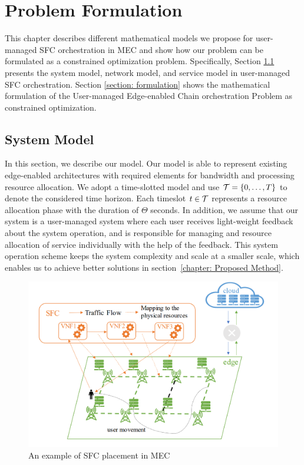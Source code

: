 \chapter{\textbf{Problem Formulation}}
This chapter describes different mathematical models we propose for user-managed SFC orchestration in MEC and show how our problem can be formulated as a constrained optimization problem. Specifically, Section \ref{section: system model} presents the system model, network model, and service model in user-managed SFC orchestration. Section \ref{section: formulation} shows the mathematical formulation of the User-managed Edge-enabled Chain orchestration Problem as constrained optimization.


\section{System Model}
\label{section: system model}
In this section, we describe our model.
Our model is able to represent existing edge-enabled architectures with required elements for bandwidth and processing resource allocation.
We adopt a time-slotted model and use $\mathcal{T}=\{0,\dots,T\}$ to denote the considered time horizon. Each timeslot $t\in\mathcal{T}$ represents a resource allocation phase with the duration of $\Theta$ seconds.   
In addition, we assume that our system is a user-managed system where each user receives light-weight feedback about the system operation, and is responsible for managing and resource allocation of service individually with the help of the feedback.
This system operation scheme keeps the system complexity and scale at a smaller scale, which enables us to achieve better solutions in section~\ref{chapter: Proposed Method}.  

\begin{figure}
	\centering
	\includegraphics[width=0.9\linewidth]{figs/MEC_SFCdiagram_colored2.PNG}
		\vspace{\baselineskip}
	\caption{An example of SFC placement in MEC}
	\label{fig:mecsfcdiagram}
\end{figure}
